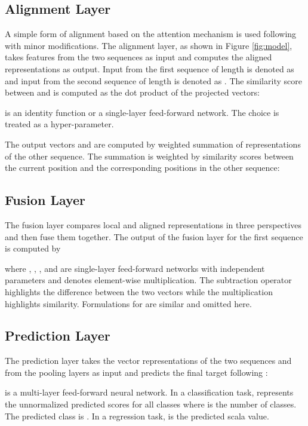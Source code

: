 \documentclass[11pt,a4paper]{article}
\begin{document}
\subsection{Alignment Layer}

A simple form of alignment based on the attention mechanism is used following \citeauthor{parikh2016decomposable}  with minor modifications. The alignment layer, as shown in Figure \ref{fig:model}, takes features from the two sequences as input and computes the aligned representations as output. Input from the first sequence of length  is denoted as  and input from the second sequence of length  is denoted as .
The similarity score  between  and  is computed as the dot product of the projected vectors:

 is an identity function or a single-layer feed-forward network. The choice is treated as a hyper-parameter.

The output vectors  and  are computed by weighted summation of representations of the other sequence. The summation is weighted by similarity scores between the current position and the corresponding positions in the other sequence:


\subsection{Fusion Layer}
The fusion layer compares local and aligned representations in three perspectives and then fuse them together. The output of the fusion layer for the first sequence  is computed by

where , , , and  are single-layer feed-forward networks with independent parameters and  denotes element-wise multiplication. The subtraction operator highlights the difference between the two vectors while the multiplication highlights similarity. Formulations for  are similar and omitted here.

\subsection{Prediction Layer}
The prediction layer takes the vector representations of the two sequences  and  from the pooling layers as input and predicts the final target following \citeauthor{mou2016natural} :

 is a multi-layer feed-forward neural network. In a classification task,  represents the unnormalized predicted scores for all classes where  is the number of classes. The predicted class is . In a regression task,  is the predicted scala value.
\end{document}
